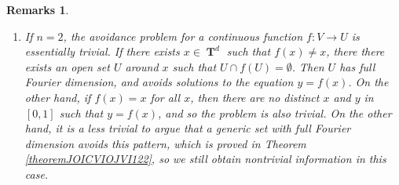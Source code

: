 \documentclass[dvipsnames,letterpaper,12pt]{article}
\numberwithin{equation}{section}
\DeclareMathOperator{\fordim}{\dim_{\mathbf{F}}}
\DeclareMathOperator{\RR}{\mathbf{R}}
\DeclareMathOperator{\TT}{\mathbf{T}}
\newtheorem{remarks}[theorem]{Remarks}
\numberwithin{theorem}{section}
\begin{document}
\begin{remarks}
\begin{enumerate}



        \item If $n = 2$, the avoidance problem for a continuous function $f: V \to U$ is essentially trivial. If there exists $x \in \TT^d$ such that $f(x) \neq x$, there there exists an open set $U$ around $x$ such that $U \cap f(U) = \emptyset$. Then $U$ has full Fourier dimension, and avoids solutions to the equation $y = f(x)$. On the other hand, if $f(x) = x$ for all $x$, then there are no distinct $x$ and $y$ in $[0,1]$ such that $y = f(x)$, and so the problem is also trivial. On the other hand, it is a less trivial to argue that a \emph{generic} set with full Fourier dimension avoids this pattern, which is proved in Theorem \ref{theoremJOICVIOJVI122}, so we still obtain nontrivial information in this case.
    \end{enumerate}
\end{remarks}

\end{document}
